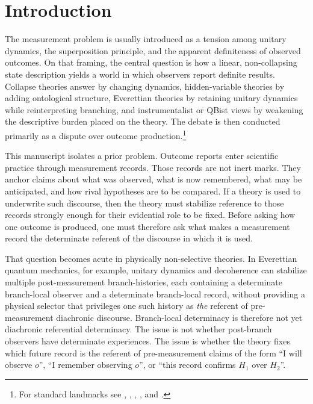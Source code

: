 \section{Introduction}

The measurement problem is usually introduced as a tension among unitary dynamics, the
superposition principle, and the apparent definiteness of observed outcomes. On that framing, the
central question is how a linear, non-collapsing state description yields a world in which observers
report definite results. Collapse theories answer by changing dynamics, hidden-variable theories by
adding ontological structure, Everettian theories by retaining unitary dynamics while reinterpreting
branching, and instrumentalist or QBist views by weakening the descriptive burden placed on the
theory. The debate is then conducted primarily as a dispute over outcome production.\footnote{For
standard landmarks see \citet{epr1935}, \citet{bell1964}, \citet{zurek2003},
\citet{schlosshauer2005}, and \citet{wallace2012}.}

This manuscript isolates a prior problem. Outcome reports enter scientific practice through
measurement records. Those records are not inert marks. They anchor claims about what was
observed, what is now remembered, what may be anticipated, and how rival hypotheses are to be
compared. If a theory is used to underwrite such discourse, then the theory must stabilize reference to
those records strongly enough for their evidential role to be fixed. Before asking how one outcome is
produced, one must therefore ask what makes a measurement record the determinate referent of the
discourse in which it is used.

That question becomes acute in physically non-selective theories. In Everettian quantum mechanics,
for example, unitary dynamics and decoherence can stabilize multiple post-measurement
branch-histories, each containing a determinate branch-local observer and a determinate branch-local
record, without providing a physical selector that privileges one such history as \emph{the} referent of
pre-measurement diachronic discourse. Branch-local determinacy is therefore not yet diachronic
referential determinacy. The issue is not whether post-branch observers have determinate experiences.
The issue is whether the theory fixes which future record is the referent of pre-measurement claims of
the form \enquote{I will observe $o$}, \enquote{I remember observing $o$}, or \enquote{this record
confirms $H_1$ over $H_2$}.

